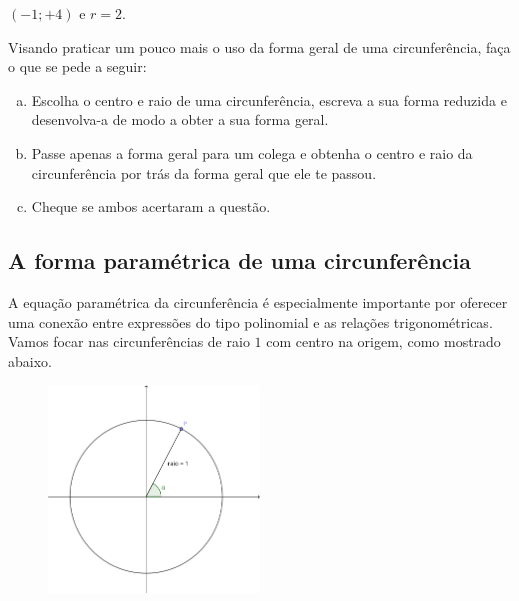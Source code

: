 \documentclass[main.tex]{subfiles}
\begin{document}
\begin{gabarito}
	\begin{gabaritoQuestao}
		$(-1;+4)$ e $r=2$.
	\end{gabaritoQuestao}
\end{gabarito}

\begin{questao}
Visando praticar um pouco mais o uso da forma geral de uma circunferência, faça o que se pede a seguir:
\begin{enumerate}[a)]
\item Escolha o centro e raio de uma circunferência, escreva a sua forma reduzida e desenvolva-a de modo a obter a sua forma geral.
\item Passe apenas a forma geral para um colega e obtenha o centro e raio da circunferência por trás da forma geral que ele te passou.
\item Cheque se ambos acertaram a questão.
\end{enumerate} 
\end{questao}


\subsection*{A forma paramétrica de uma circunferência}

A equação paramétrica da circunferência é especialmente importante por oferecer uma conexão entre expressões do tipo polinomial e as relações trigonométricas. Vamos focar nas circunferências de raio $1$ com centro na origem, como mostrado abaixo.

\begin{figure}[h]
\centering
\includegraphics[width=0.5\textwidth]{./img/c6q15.png}
\end{figure}
\end{document}
